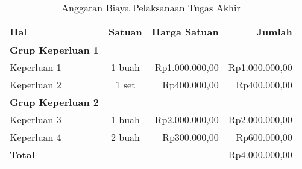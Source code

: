 \begin{table}[htbp]
	\small
	\centering
	\caption{Anggaran Biaya Pelaksanaan Tugas Akhir}
	\label{table:contoh_anggaran}
	\begin{tabular}{lcrr}
		\toprule
		\multicolumn{1}{l}{\textbf{Hal}} & \multicolumn{1}{l}{\textbf{Satuan}} & \multicolumn{1}{l}{\textbf{Harga Satuan}} & \multicolumn{1}{r}{\textbf{Jumlah}}\\
		\midrule
		\textbf{Grup Keperluan 1} \\
		Keperluan 1 & 1 buah & Rp1.000.000,00 & Rp1.000.000,00 \\
		Keperluan 2 & 1 set & Rp400.000,00 & Rp400.000,00 \\
		\midrule
		\textbf{Grup Keperluan 2} \\
		Keperluan 3 & 1 buah & Rp2.000.000,00 & Rp2.000.000,00 \\
		Keperluan 4 & 2 buah & Rp300.000,00 & Rp600.000,00 \\
		\midrule
		\textbf{Total} & & & Rp4.000.000,00 \\
		\bottomrule
	\end{tabular}
\end{table}
